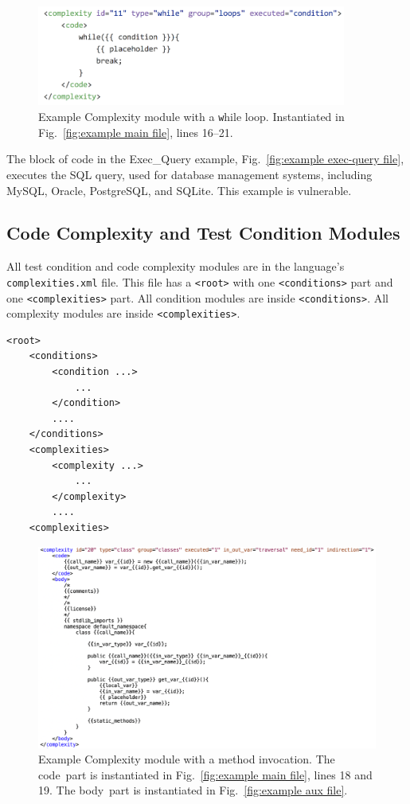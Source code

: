 \begin{figure}[tbp]
  \includegraphics[width=4in]{fig_Complexity_file_while.png}
  \caption{Example Complexity module with a {\texttt while} loop.  Instantiated in
    Fig.~\ref{fig:example main file}, lines 16--21.}
  \label{fig:example complexity-while file}
\end{figure}

The block of code in the Exec\_Query example, 
Fig.~\ref{fig:example exec-query file}, executes the SQL query, used 
for database management
systems, including MySQL, Oracle, PostgreSQL, and SQLite.  This example is
vulnerable.


\subsection{Code Complexity and Test Condition Modules}

All test condition and code complexity modules are in the 
language's \verb|complexities.xml| file.  This file has
a \verb|<root>| with one \verb|<conditions>| part and one
\verb|<complexities>| part.
All condition modules are inside \verb|<conditions>|.  All
complexity modules are inside \verb|<complexities>|.

\begin{verbatim}
<root>
    <conditions>
        <condition ...>
            ...
        </condition>
        ....
    </conditions>
    <complexities>
        <complexity ...>
            ...
        </complexity>
        ....
    <complexities>
\end{verbatim}

\begin{figure}[tbph]
  \includegraphics[width=\linewidth]{fig_Complexity_file_method.png}
  \caption{Example Complexity module with a method invocation.
  The \texlangle code\texrangle\  part is instantiated in
  Fig.~\ref{fig:example main file}, lines 18 and 19.
  The \texlangle body\texrangle\  part is instantiated in
  Fig.~\ref{fig:example aux file}.}
  \label{fig:example complexity-method file}
\end{figure}

